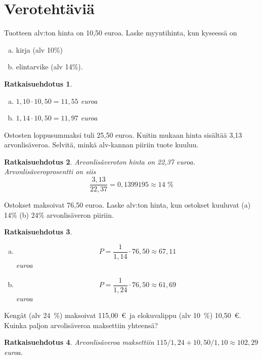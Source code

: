 \documentclass[a4paper,10pt]{article}\usepackage[]{graphicx}\usepackage[]{color}
\newtheorem*{ratk}{Ratkaisuehdotus}
\begin{document}
\pagestyle{empty}

\section*{Verotehtäviä}


\begin{teht}
  Tuotteen alv:ton hinta on 10,50 euroa. Laske myyntihinta, kun kyseessä on
  \begin{enumerate}[(a)]
    \item kirja (alv 10\%) 
    \item elintarvike (alv 14\%).
  \end{enumerate}
\end{teht}
\begin{ratk}
  \begin{enumerate}[(a)] 
    \item \(1,10\cdot10,50 = 11{,}55\) euroa
    \item \(1,14\cdot10,50 = 11{,}97\) euroa
  \end{enumerate}
\end{ratk}

\begin{teht}
  Ostosten loppusummaksi tuli 25,50 euroa. Kuitin mukaan hinta sisältää 3,13 arvonlisäveroa. Selvitä, minkä alv-kannan piiriin tuote kuuluu.
\end{teht}
\begin{ratk}
  Arvonlisäveroton hinta on 22{,}37 euroa. Arvonlisäveroprosentti on siis 
  \[
    \frac{3,13}{22{,}37}=0{,}1399195 \approx 14\text{~\%} 
  \]
\end{ratk}

\begin{teht}
  Ostokset maksoivat 76,50 euroa. Laske alv:ton hinta, kun ostokset kuuluvat (a) 14\% (b) 24\% arvonlisäveron piiriin.
\end{teht}
\begin{ratk}
  \begin{enumerate}[(a)]
    \item 
      \[
        P = \frac{1}{1,14}\cdot76,50\approx 67{,}11
      \]euroa
    \item 
      \[
        P = \frac{1}{1,24}\cdot76,50\approx 61{,}69
      \] euroa
  \end{enumerate}
\end{ratk}

\begin{teht}
  Kengät (alv 24~\%) maksoivat 115,00~\euro\ ja elokuvalippu (alv 10~\%) 10,50~\euro. Kuinka paljon arvolisäveroa maksettiin yhteensä?
\end{teht}
\begin{ratk}
  Arvonlisäveroa maksettiin \(115/1,24 + 10,50/1,10 \approx 102{,}29\) euroa.
\end{ratk}
\end{document}
